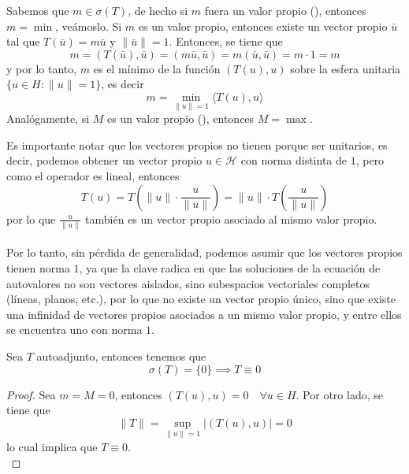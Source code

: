 \begin{observacion}
    Sabemos que $m\in \sigma(T)$, de hecho si $m$ fuera un valor propio (), entonces \underline{$m = \min$}, veámoslo. Si $m$ es un valor propio, entonces existe un vector propio $\bar{u}$ tal que $T(\bar{u}) = m \bar{u}$ y $\|\bar{u}\| = 1$. Entonces, se tiene que
    \begin{equation*}
        m = ( T(\bar{u}), \bar{u} ) = ( m \bar{u}, \bar{u} ) = m ( \bar{u}, \bar{u} ) = m \cdot 1 = m
    \end{equation*}
    y por lo tanto, $m$ es el mínimo de la función $( T(u), u )$ sobre la esfera unitaria $\{u \in H : \|u\| = 1\}$, es decir 
    $$m = \min_{\|u\|=1} \langle T(u), u \rangle$$
    Analógamente, si $M$ es un valor propio (), entonces \underline{$M = \max$}.
\end{observacion}


\begin{observacion}
    Es importante notar que los vectores propios no tienen porque ser unitarios, es decir, podemos obtener un vector propio $u\in \mathcal{H}$ con norma distinta de $1$, pero como el operador es lineal, entonces 
    $$T(u) = T\left(\|u\| \cdot \frac{u}{\|u\|}\right) = \|u\| \cdot T\left(\frac{u}{\|u\|}\right)$$
    por lo que $\frac{u}{\|u\|}$ también es un vector propio asociado al mismo valor propio. \\ \\
    \noindent
    Por lo tanto, sin pérdida de generalidad, podemos asumir que los vectores propios tienen norma $1$, ya que la clave radica en que las soluciones de la ecuación de autovalores no son vectores aislados, sino subespacios vectoriales completos (líneas, planos, etc.), por lo que no existe un vector propio único, sino que existe una infinidad de vectores propios asociados a un mismo valor propio, y entre ellos se encuentra uno con norma $1$.
\end{observacion}

\begin{coro}
    Sea $T$ autoadjunto, entonces tenemos que 
    \begin{equation*}
        \sigma(T)=\{0\}\implies T \equiv 0
    \end{equation*}
\begin{proof}
    Sea $m=M=0$, entonces $( T(u), u ) = 0 \quad \forall u \in H$. Por otro lado, se tiene que
    \begin{equation*}
        \|T\| = \sup_{\|u\|=1} |( T(u), u )| = 0
    \end{equation*}
    lo cual implica que $T \equiv 0$. \\
\end{proof}
\end{coro}

